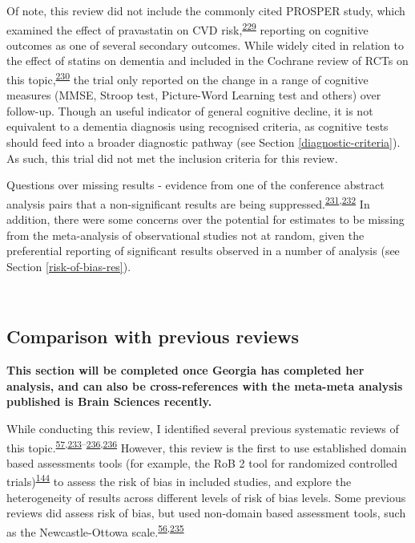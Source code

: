 \documentclass[a4paper, twoside]{templates/ociamthesis}
\begin{document}
Of note, this review did not include the commonly cited PROSPER study, which examined the effect of pravastatin on CVD risk,\textsuperscript{\protect\hyperlink{ref-shepherd2002a}{229}} reporting on cognitive outcomes as one of several secondary outcomes. While widely cited in relation to the effect of statins on dementia and included in the Cochrane review of RCTs on this topic,\textsuperscript{\protect\hyperlink{ref-mcguinness2016}{230}} the trial only reported on the change in a range of cognitive measures (MMSE, Stroop test, Picture-Word Learning test and others) over follow-up. Though an useful indicator of general cognitive decline, it is not equivalent to a dementia diagnosis using recognised criteria, as cognitive tests should feed into a broader diagnostic pathway (see Section \ref{diagnostic-criteria}). As such, this trial did not met the inclusion criteria for this review.

Questions over missing results - evidence from one of the conference abstract analysis pairs that a non-significant results are being suppressed.\textsuperscript{\protect\hyperlink{ref-yamada2009}{231},\protect\hyperlink{ref-yamada2009a}{232}} In addition, there were some concerns over the potential for estimates to be missing from the meta-analysis of observational studies not at random, given the preferential reporting of significant results observed in a number of analysis (see Section \ref{risk-of-bias-res}).

~

\hypertarget{rev-previous-reviews}{%
\subsection{Comparison with previous reviews}\label{rev-previous-reviews}}

\textbf{This section will be completed once Georgia has completed her analysis, and can also be cross-references with the meta-meta analysis published is Brain Sciences recently.}

While conducting this review, I identified several previous systematic reviews of this topic.\textsuperscript{\protect\hyperlink{ref-chu2018}{57},\protect\hyperlink{ref-yang2020}{233}--\protect\hyperlink{ref-kuzma2018a}{236},\protect\hyperlink{ref-kuzma2018a}{236}} However, this review is the first to use established domain based assessments tools (for example, the RoB 2 tool for randomized controlled trials)\textsuperscript{\protect\hyperlink{ref-sterne2019}{144}} to assess the risk of bias in included studies, and explore the heterogeneity of results across different levels of risk of bias levels. Some previous reviews did assess risk of bias, but used non-domain based assessment tools, such as the Newcastle-Ottowa scale.\textsuperscript{\protect\hyperlink{ref-anstey2015}{56},\protect\hyperlink{ref-poly2020}{235}}
\end{document}
